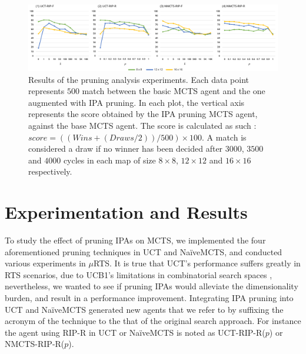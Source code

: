 \documentclass[conference]{IEEEtran}
\newcommand{\mRTS}{$\mu$RTS}
\begin{document}

\begin{figure}[!h]
\begin{center}
	\includegraphics[width=1\textwidth]{figs/PT-h.pdf}
	\caption{Results of the pruning analysis experiments. Each data point represents $500$ match between the basic MCTS agent and the one augmented with IPA pruning. In each plot, the vertical axis represents the score obtained by the IPA pruning MCTS agent, against the base MCTS agent. The score is calculated as such : $score = ((Wins + (Draws / 2)) / 500) \times 100$. A match is considered a draw if no winner has been decided after $3000$, $3500$ and $4000$ cycles in each map of size $8\times8$, $12\times12$ and $16\times16$ respectively.}
	\label{PruningAnalysis}
\end{center}
\end{figure}



\section{Experimentation and Results}
\label{sec:experiments}


To study the effect of pruning IPAs on MCTS, we implemented the four aforementioned pruning techniques in UCT and NaïveMCTS, and conducted various experiments in \mRTS{}. It is true that UCT's performance suffers greatly in RTS scenarios, due to UCB1's limitations in combinatorial search spaces \cite{ontanon_combinatorial_2013}, nevertheless, we wanted to see if pruning IPAs would alleviate the dimensionality burden, and result in a performance improvement. Integrating IPA pruning into UCT and NaïveMCTS generated new agents that we refer to by suffixing the acronym of the technique to the that of the original search approach. For instance the agent using RIP-R in UCT or NaïveMCTS is noted as UCT-RIP-R($p$) or NMCTS-RIP-R($p$).
\end{document}
